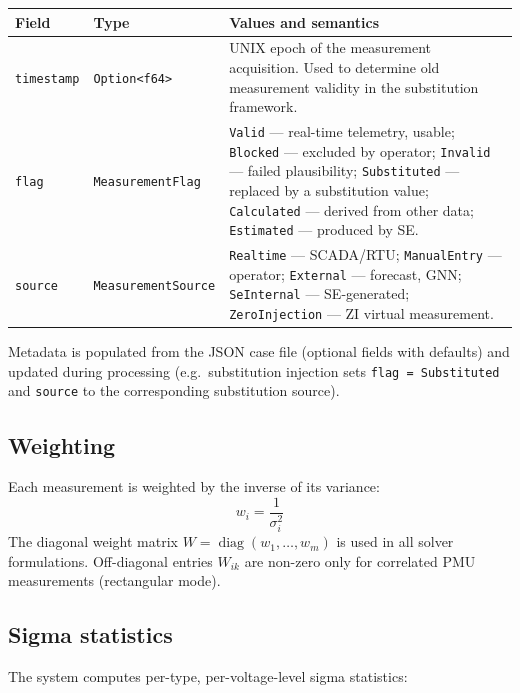 \documentclass[11pt,a4paper]{article}
\begin{document}
\begin{center}
\small
\begin{tabular}{llp{62mm}}
  \toprule
  \textbf{Field} & \textbf{Type} & \textbf{Values and semantics} \\
  \midrule
  \texttt{timestamp} & \texttt{Option<f64>} &
    UNIX epoch of the measurement acquisition.  Used to determine old
    measurement validity in the substitution framework. \\
  \texttt{flag} & \texttt{MeasurementFlag} &
    \texttt{Valid} --- real-time telemetry, usable;
    \texttt{Blocked} --- excluded by operator;
    \texttt{Invalid} --- failed plausibility;
    \texttt{Substituted} --- replaced by a substitution value;
    \texttt{Calculated} --- derived from other data;
    \texttt{Estimated} --- produced by SE. \\
  \texttt{source} & \texttt{MeasurementSource} &
    \texttt{Realtime} --- SCADA/RTU;
    \texttt{ManualEntry} --- operator;
    \texttt{External} --- forecast, GNN;
    \texttt{SeInternal} --- SE-generated;
    \texttt{ZeroInjection} --- ZI virtual measurement. \\
  \bottomrule
\end{tabular}
\end{center}

\noindent
Metadata is populated from the JSON case file (optional fields with
defaults) and updated during processing (e.g.\ substitution injection sets
\texttt{flag = Substituted} and \texttt{source} to the corresponding
substitution source).

\subsection{Weighting}\label{sec:weight}

Each measurement is weighted by the inverse of its variance:
\begin{equation}
  w_i = \frac{1}{\sigma_i^2}
\end{equation}
The diagonal weight matrix $W = \operatorname{diag}(w_1, \ldots, w_m)$ is
used in all solver formulations.  Off-diagonal entries $W_{ik}$ are
non-zero only for correlated PMU measurements (rectangular mode).

\subsection{Sigma statistics}\label{sec:sigma-stats}

The system computes per-type, per-voltage-level sigma statistics:
\end{document}
